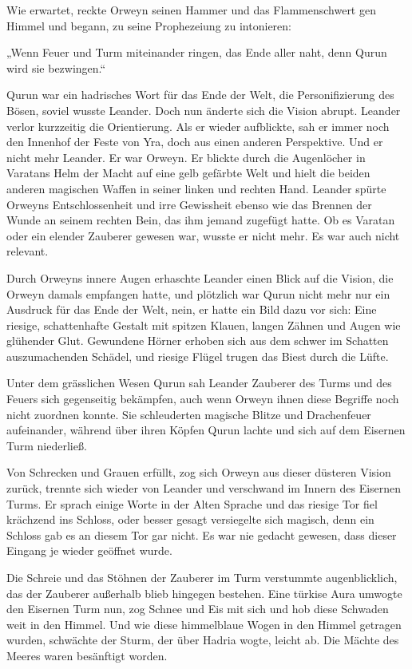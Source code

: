 Wie erwartet, reckte Orweyn seinen Hammer und das Flammenschwert gen Himmel und begann, zu seine Prophezeiung zu intonieren:

„Wenn Feuer und Turm miteinander ringen, das Ende aller naht, denn Qurun wird sie bezwingen.“

Qurun war ein hadrisches Wort für das Ende der Welt, die Personifizierung des Bösen, soviel wusste Leander. Doch nun änderte sich die Vision abrupt. Leander verlor kurzzeitig die Orientierung. Als er wieder aufblickte, sah er immer noch den Innenhof der Feste von Yra, doch aus einen anderen Perspektive. Und er nicht mehr Leander. Er war Orweyn. Er blickte durch die Augenlöcher in Varatans Helm der Macht auf eine gelb gefärbte Welt und hielt die beiden anderen magischen Waffen in seiner linken und rechten Hand. Leander spürte Orweyns Entschlossenheit und irre Gewissheit ebenso wie das Brennen der Wunde an seinem rechten Bein, das ihm jemand zugefügt hatte. Ob es Varatan oder ein elender Zauberer gewesen war, wusste er nicht mehr. Es war auch nicht relevant.

Durch Orweyns innere Augen erhaschte Leander einen Blick auf die Vision, die Orweyn damals empfangen hatte, und plötzlich war Qurun nicht mehr nur ein Ausdruck für das Ende der Welt, nein, er hatte ein Bild dazu vor sich: Eine riesige, schattenhafte Gestalt mit spitzen Klauen, langen Zähnen und Augen wie glühender Glut. Gewundene Hörner erhoben sich aus dem schwer im Schatten auszumachenden Schädel, und riesige Flügel trugen das Biest durch die Lüfte.

Unter dem grässlichen Wesen Qurun sah Leander Zauberer des Turms und des Feuers sich gegenseitig bekämpfen, auch wenn Orweyn ihnen diese Begriffe noch nicht zuordnen konnte. Sie schleuderten magische Blitze und Drachenfeuer aufeinander, während über ihren Köpfen Qurun lachte und sich auf dem Eisernen Turm niederließ.

Von Schrecken und Grauen erfüllt, zog sich Orweyn aus dieser düsteren Vision zurück, trennte sich wieder von Leander und verschwand im Innern des Eisernen Turms. Er sprach einige Worte in der Alten Sprache und das riesige Tor fiel krächzend ins Schloss, oder besser gesagt versiegelte sich magisch, denn ein Schloss gab es an diesem Tor gar nicht. Es war nie gedacht gewesen, dass dieser Eingang je wieder geöffnet wurde.

Die Schreie und das Stöhnen der Zauberer im Turm verstummte augenblicklich, das der Zauberer außerhalb blieb hingegen bestehen. Eine türkise Aura umwogte den Eisernen Turm nun, zog Schnee und Eis mit sich und hob diese Schwaden weit in den Himmel. Und wie diese himmelblaue Wogen in den Himmel getragen wurden, schwächte der Sturm, der über Hadria wogte, leicht ab. Die Mächte des Meeres waren besänftigt worden.

